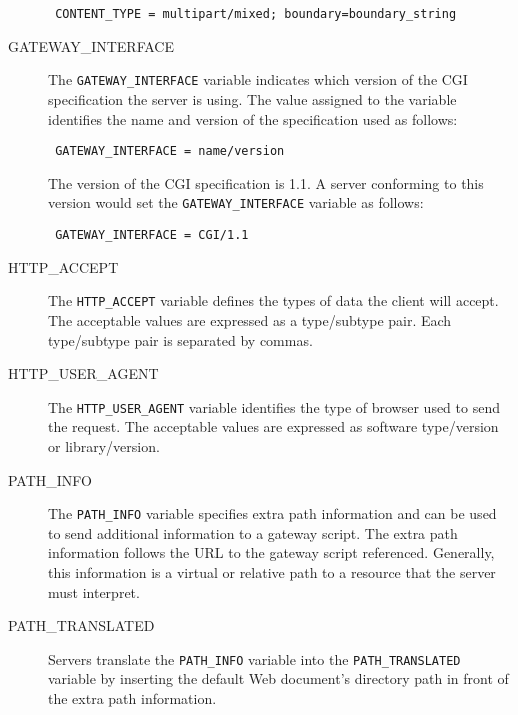 \begin{description}
{\footnotesize
\begin{verbatim}
 CONTENT_TYPE = multipart/mixed; boundary=boundary_string
\end{verbatim}
}

\item[GATEWAY\_INTERFACE]

The \verb|GATEWAY_INTERFACE| variable indicates which version of the CGI
specification the server is using. The value assigned to the variable identifies
the name and version of the specification used as follows:

{\footnotesize
\begin{verbatim}
 GATEWAY_INTERFACE = name/version
\end{verbatim}
}

The version of the CGI specification is 1.1. A server conforming
to this version would set the \verb|GATEWAY_INTERFACE| variable as follows:

{\footnotesize
\begin{verbatim}
 GATEWAY_INTERFACE = CGI/1.1
\end{verbatim}
}

\item[HTTP\_ACCEPT]

The \verb|HTTP_ACCEPT| variable defines the types of data the client will
accept. The acceptable values are expressed as a type/subtype pair. Each
type/subtype pair is separated by commas.

\item[HTTP\_USER\_AGENT]

The \verb|HTTP_USER_AGENT| variable identifies the type of browser used to send
the request. The acceptable values are expressed as software type/version
or library/version. 

\item[PATH\_INFO]

The \verb|PATH_INFO| variable specifies extra path information and can be used
to send additional information to a gateway script. The extra path information
follows the URL to the gateway script referenced. Generally, this information
is a virtual or relative path to a resource that the server must interpret. 

\item[PATH\_TRANSLATED]

Servers translate the \verb|PATH_INFO| variable into the \verb|PATH_TRANSLATED|
variable by inserting the default Web document's directory path in front of the
extra path information. 


\end{description}

